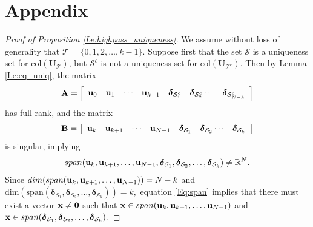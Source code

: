 \documentclass[journal, 10pt]{IEEEtran}
\begin{document}
\section{Appendix}
{\footnotesize
\begin{proof}[Proof of Proposition \ref{Le:highpass_uniqueness}]
We assume without loss of generality that ${\mathcal T}=\{0,1,2,\ldots,k-1\}$. 
Suppose first that the set $\mathcal{S}$ is a uniqueness set for $\mbox{col}({\mathbf{U}}_{\mathcal T})$, but $\mathcal{S}^c$ is not a uniqueness set for $\mbox{col}({\mathbf{U}}_{{\mathcal T}^c})$. Then by Lemma \ref{Le:eq_uniq}, the matrix $$\mathbf{A}=
 \left[ \begin{array}{cccccccc}
{\bf u}_{0} & {\bf u}_{1} & \cdots & {\bf u}_{k-1} & {\boldsymbol \delta}_{{\mathcal{S}}^c_1} & {\boldsymbol \delta}_{{\mathcal{S}}^c_2} \cdots & {\boldsymbol \delta}_{{\mathcal{S}}^c_{N-k}} \end{array} \right]$$
has full rank, and the matrix $$\mathbf{B}=
 \left[ \begin{array}{cccccccc}
{\bf u}_{k} & {\bf u}_{k+1} & \cdots & {\bf u}_{N-1} & {\boldsymbol \delta}_{\mathcal{S}_{1}} & {\boldsymbol \delta}_{\mathcal{S}_{2}} \cdots & {\boldsymbol \delta}_{\mathcal{S}_k} \end{array} \right]$$
is singular, implying
\begin{align}\label{Eq:span}
\mbox{span}({\bf u}_{k}, {\bf u}_{k+1},\ldots, {\bf u}_{N-1}, {\boldsymbol \delta}_{\mathcal{S}_{1}}, {\boldsymbol \delta}_{\mathcal{S}_{2}}, \ldots, {\boldsymbol \delta}_{\mathcal{S}_k}) \neq \mathbb{R}^N.
\end{align}
Since 
$\mbox{dim}(\mbox{span}({\bf u}_{k}, {\bf u}_{k+1},\ldots, {\bf u}_{N-1}))=N-k$ and $\mbox{dim}(\mbox{span}({\boldsymbol \delta}_{S_{1}}, {\boldsymbol \delta}_{S_{2}}, \ldots, {\boldsymbol \delta}_{\mathcal{S}_k}))=k,$ equation 
\eqref{Eq:span} implies that
there must exist a vector ${\bf x} \neq {\bf 0}$ such that 
${\bf x} \in  \mbox{span}({\bf u}_{k}, {\bf u}_{k+1},\ldots, {\bf u}_{N-1})$ and  
$ {\bf x} \in \mbox{span}({\boldsymbol \delta}_{\mathcal{S}_{1}}, {\boldsymbol \delta}_{\mathcal{S}_{2}}, \ldots, {\boldsymbol \delta}_{\mathcal{S}_{k}})$.%

\end{proof}}
\end{document}
